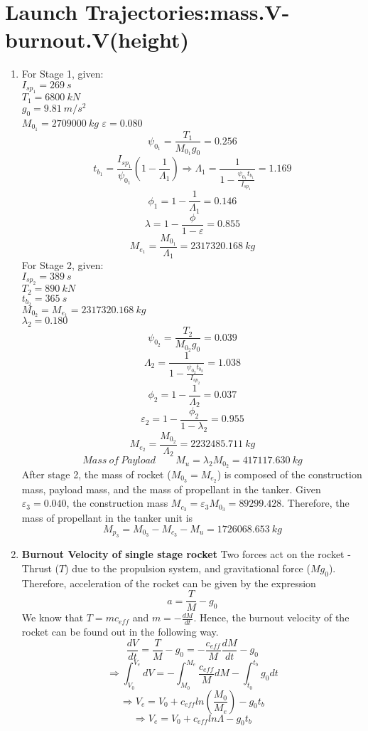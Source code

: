 \section{ Launch Trajectories:mass.V-burnout.V(height) }\label{sec:q2}    

\begin{enumerate}[label=(\alph*)]
\item
For Stage 1, given:\\
$ I_{sp_{1}} = 269 \: s $\\
$ T_1 = 6800 \: kN $\\
$ g_0=9.81 \: m/s^2 $\\
$ M_{0_1} = 2709000 \: kg$
$ \varepsilon = 0.080	$
$$ \psi_{0_{1}} = \frac{T_1}{M_{0_1}g_0} = 0.256 $$
$$ t_{b_1} = \frac{I_{sp_1}}{\psi_{0_1}}\left(1-\frac{1}{\Lambda_1}\right) \Rightarrow \Lambda_1 = \frac{1}{1-\frac{\psi_{0_1}t_{b_1}}{I_{sp_1}}} = 1.169 $$
$$\phi_1 = 1-\frac{1}{\Lambda_1} = 0.146$$
$$ \lambda = 1-\frac{\phi}{1-\varepsilon} = 0.855$$
$$ M_{e_1} = \frac{M_{0_1}}{\Lambda_1} = 2317320.168 \: kg$$
For Stage 2, given:\\
$ I_{sp_{2}} = 389 \: s $\\
$ T_2 = 890 \: kN $\\
$ t_{b_2} = 365 \: s$\\
$ M_{0_2} = M_{e_1} = 2317320.168 \: kg$\\
$ \lambda_2 = 0.180$
$$ \psi_{0_{2}} = \frac{T_2}{M_{0_2}g_0} = 0.039 $$
$$ \Lambda_2 = \frac{1}{1-\frac{\psi_{0_2}t_{b_2}}{I_{sp_2}}} = 1.038$$
$$ \phi_2 = 1-\frac{1}{\Lambda_2} = 0.037$$
$$ \varepsilon_2 = 1-\frac{\phi_2}{1-\lambda_2} = 0.955$$
$$ M_{e_2} = \frac{M_{0_2}}{\Lambda_2} = 2232485.711 \: kg$$
$$ Mass\: of\: Payload \qquad M_{u} = \lambda_2 M_{0_2} = 417117.630 \: kg$$
After stage 2, the mass of rocket ($M_{0_3}=M_{e_2}$) is composed of the construction mass, payload mass, and the mass of propellant in the tanker. Given $\varepsilon_3=0.040$, the construction mass $M_{c_3}=\varepsilon_3 M_{0_3} = 89299.428$.
Therefore, the mass of propellant in the tanker unit is
$$  M_{p_3}= M_{0_3}-M_{c_3}-M_{u}=1726068.653 \: kg$$

\item
\textbf{Burnout Velocity of single stage rocket}
Two forces act on the rocket - Thrust ($T$) due to the propulsion system, and gravitational force ($Mg_0$). Therefore, acceleration of the rocket can be given by the expression
$$ a = \frac{T}{M}-g_0$$ 
We know that $T=mc_{eff}$ and $m=-\frac{dM}{dt}$. Hence, the burnout velocity of the rocket can be found out in the following way.
$$ \frac{dV}{dt} = \frac{T}{M}-g_0 = -\frac{c_{eff}}{M}\frac{dM}{dt}-g_0$$
$$\Rightarrow \int^{V_e}_{V_0}dV=-\int^{M_e}_{M_0}\frac{c_{eff}}{M}dM-\int^{t_b}_{t_0}g_0dt$$
$$ \Rightarrow V_e = V_0 +c_{eff}ln\left(\frac{M_0}{M_e}\right)-g_0t_b$$
$$\Rightarrow V_e = V_0 +c_{eff}ln\Lambda-g_0t_b$$


\end{enumerate}
